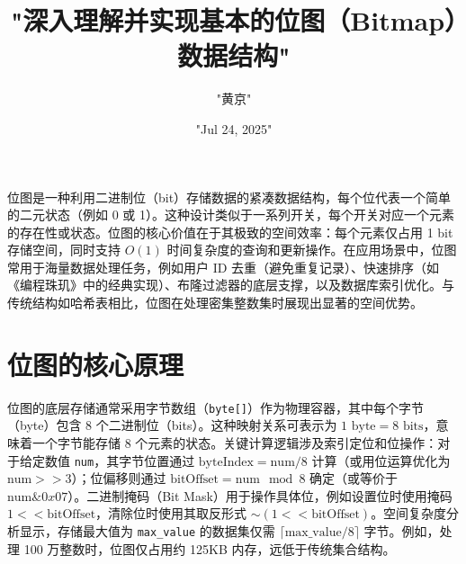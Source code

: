 \title{"深入理解并实现基本的位图（Bitmap）数据结构"}
\author{"黄京"}
\date{"Jul 24, 2025"}
\maketitle
位图是一种利用二进制位（bit）存储数据的紧凑数据结构，每个位代表一个简单的二元状态（例如 0 或 1）。这种设计类似于一系列开关，每个开关对应一个元素的存在性或状态。位图的核心价值在于其极致的空间效率：每个元素仅占用 1 bit 存储空间，同时支持 $ O(1) $ 时间复杂度的查询和更新操作。在应用场景中，位图常用于海量数据处理任务，例如用户 ID 去重（避免重复记录）、快速排序（如《编程珠玑》中的经典实现）、布隆过滤器的底层支撑，以及数据库索引优化。与传统结构如哈希表相比，位图在处理密集整数集时展现出显著的空间优势。\par
\chapter{位图的核心原理}
位图的底层存储通常采用字节数组（\texttt{byte[]}）作为物理容器，其中每个字节（byte）包含 8 个二进制位（bits）。这种映射关系可表示为 $ 1 \text{ byte} = 8 \text{ bits} $，意味着一个字节能存储 8 个元素的状态。关键计算逻辑涉及索引定位和位操作：对于给定数值 \texttt{num}，其字节位置通过 $ \text{byteIndex} = \text{num} / 8 $ 计算（或用位运算优化为 $ \text{num} >> 3 $）；位偏移则通过 $ \text{bitOffset} = \text{num} \mod 8 $ 确定（或等价于 $ \text{num} \& 0x07 $）。二进制掩码（Bit Mask）用于操作具体位，例如设置位时使用掩码 $ 1 << \text{bitOffset} $，清除位时使用其取反形式 $ \sim(1 << \text{bitOffset}) $。空间复杂度分析显示，存储最大值为 \texttt{max\_{}value} 的数据集仅需 $ \lceil \text{max\_value} / 8 \rceil $ 字节。例如，处理 100 万整数时，位图仅占用约 125KB 内存，远低于传统集合结构。\par
